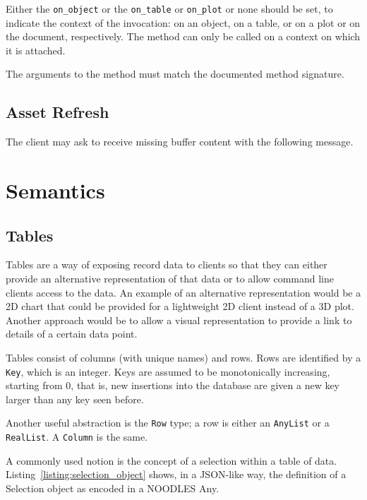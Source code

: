 \documentclass[11pt, oneside]{amsart}
\begin{document}
Either the \texttt{on\_object} or the \texttt{on\_table} or \texttt{on\_plot} or none should be set, to indicate the context of the invocation: on an object, on a table, or on a plot or on the document, respectively. The method can only be called on a context on which it is attached.

The arguments to the method must match the documented method signature.

\subsection{Asset Refresh}
\label{sec:refresh_message}

The client may ask to receive missing buffer content with the following message.




\section{Semantics}


\subsection{Tables}

Tables are a way of exposing record data to clients so that they can either provide an alternative representation of that data or to allow command line clients access to the data. An example of an alternative representation would be a 2D chart that could be provided for a lightweight 2D client instead of a 3D plot. Another approach would be to allow a visual representation to provide a link to details of a certain data point.

Tables consist of columns (with unique names) and rows. Rows are identified by a \texttt{Key}, which is an integer. Keys are assumed to be monotonically increasing, starting from 0, that is, new insertions into the database are given a new key larger than any key seen before.

Another useful abstraction is the \texttt{Row} type; a row is either an \texttt{AnyList} or a \texttt{RealList}. A \texttt{Column} is the same.

A commonly used notion is the concept of a selection within a table of data. Listing~\ref{listing:selection_object} shows, in a JSON-like way, the definition of a Selection object as encoded in a NOODLES Any.
\end{document}
